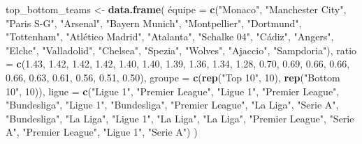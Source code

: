 \documentclass[
]{article}
\newenvironment{Shaded}{\begin{snugshade}}{\end{snugshade}}
\newcommand{\AttributeTok}[1]{\textcolor[rgb]{0.13,0.29,0.53}{#1}}
\newcommand{\DecValTok}[1]{\textcolor[rgb]{0.00,0.00,0.81}{#1}}
\newcommand{\FloatTok}[1]{\textcolor[rgb]{0.00,0.00,0.81}{#1}}
\newcommand{\FunctionTok}[1]{\textcolor[rgb]{0.13,0.29,0.53}{\textbf{#1}}}
\newcommand{\NormalTok}[1]{#1}
\newcommand{\OtherTok}[1]{\textcolor[rgb]{0.56,0.35,0.01}{#1}}
\newcommand{\StringTok}[1]{\textcolor[rgb]{0.31,0.60,0.02}{#1}}
\begin{document}
\begin{Shaded}
\begin{Highlighting}[]
\NormalTok{top\_bottom\_teams }\OtherTok{\textless{}{-}} \FunctionTok{data.frame}\NormalTok{(}
\NormalTok{  é}\AttributeTok{quipe =} \FunctionTok{c}\NormalTok{(}\StringTok{"Monaco"}\NormalTok{, }\StringTok{"Manchester City"}\NormalTok{, }\StringTok{"Paris S{-}G"}\NormalTok{, }\StringTok{"Arsenal"}\NormalTok{, }\StringTok{"Bayern Munich"}\NormalTok{, }\StringTok{"Montpellier"}\NormalTok{, }\StringTok{"Dortmund"}\NormalTok{, }
             \StringTok{"Tottenham"}\NormalTok{, }\StringTok{"Atlético Madrid"}\NormalTok{, }\StringTok{"Atalanta"}\NormalTok{, }\StringTok{"Schalke 04"}\NormalTok{, }\StringTok{"Cádiz"}\NormalTok{, }\StringTok{"Angers"}\NormalTok{, }\StringTok{"Elche"}\NormalTok{, }\StringTok{"Valladolid"}\NormalTok{, }
             \StringTok{"Chelsea"}\NormalTok{, }\StringTok{"Spezia"}\NormalTok{, }\StringTok{"Wolves"}\NormalTok{, }\StringTok{"Ajaccio"}\NormalTok{, }\StringTok{"Sampdoria"}\NormalTok{),}
  \AttributeTok{ratio =} \FunctionTok{c}\NormalTok{(}\FloatTok{1.43}\NormalTok{, }\FloatTok{1.42}\NormalTok{, }\FloatTok{1.42}\NormalTok{, }\FloatTok{1.42}\NormalTok{, }\FloatTok{1.40}\NormalTok{, }\FloatTok{1.40}\NormalTok{, }\FloatTok{1.39}\NormalTok{, }\FloatTok{1.36}\NormalTok{, }\FloatTok{1.34}\NormalTok{, }\FloatTok{1.28}\NormalTok{, }\FloatTok{0.70}\NormalTok{, }\FloatTok{0.69}\NormalTok{, }\FloatTok{0.66}\NormalTok{, }\FloatTok{0.66}\NormalTok{, }\FloatTok{0.66}\NormalTok{, }\FloatTok{0.63}\NormalTok{, }
            \FloatTok{0.61}\NormalTok{, }\FloatTok{0.56}\NormalTok{, }\FloatTok{0.51}\NormalTok{, }\FloatTok{0.50}\NormalTok{),}
  \AttributeTok{groupe =} \FunctionTok{c}\NormalTok{(}\FunctionTok{rep}\NormalTok{(}\StringTok{"Top 10"}\NormalTok{, }\DecValTok{10}\NormalTok{), }\FunctionTok{rep}\NormalTok{(}\StringTok{"Bottom 10"}\NormalTok{, }\DecValTok{10}\NormalTok{)),}
  \AttributeTok{ligue =} \FunctionTok{c}\NormalTok{(}\StringTok{"Ligue 1"}\NormalTok{, }\StringTok{"Premier League"}\NormalTok{, }\StringTok{"Ligue 1"}\NormalTok{, }\StringTok{"Premier League"}\NormalTok{, }\StringTok{"Bundesliga"}\NormalTok{, }\StringTok{"Ligue 1"}\NormalTok{, }\StringTok{"Bundesliga"}\NormalTok{, }
            \StringTok{"Premier League"}\NormalTok{, }\StringTok{"La Liga"}\NormalTok{, }\StringTok{"Serie A"}\NormalTok{, }\StringTok{"Bundesliga"}\NormalTok{, }\StringTok{"La Liga"}\NormalTok{, }\StringTok{"Ligue 1"}\NormalTok{, }\StringTok{"La Liga"}\NormalTok{, }\StringTok{"La Liga"}\NormalTok{, }
            \StringTok{"Premier League"}\NormalTok{, }\StringTok{"Serie A"}\NormalTok{, }\StringTok{"Premier League"}\NormalTok{, }\StringTok{"Ligue 1"}\NormalTok{, }\StringTok{"Serie A"}\NormalTok{)}
\NormalTok{)}


\end{Highlighting}
\end{Shaded}
\end{document}
